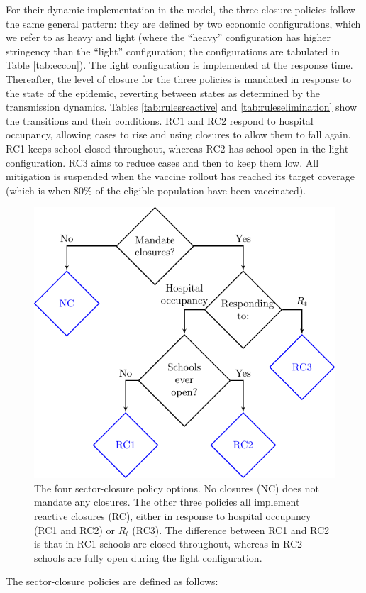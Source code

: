 \documentclass[
]{article}
\begin{document}
For their dynamic implementation in the model, the three closure policies follow the same general pattern: they are defined by two economic configurations, which we refer to as heavy and light (where the ``heavy'' configuration has higher stringency than the ``light'' configuration; the configurations are tabulated in Table \ref{tab:eccon}). The light configuration is implemented at the response time. Thereafter, the level of closure for the three policies is mandated in response to the state of the epidemic, reverting between states as determined by the transmission dynamics. Tables \ref{tab:rulesreactive} and \ref{tab:ruleselimination} show the transitions and their conditions. RC1 and RC2 respond to hospital occupancy, allowing cases to rise and using closures to allow them to fall again. RC1 keeps school closed throughout, whereas RC2 has school open in the light configuration. RC3 aims to reduce cases and then to keep them low. All mitigation is suspended when the vaccine rollout has reached its target coverage (which is when 80\% of the eligible population have been vaccinated).

\begin{figure}
\includegraphics[width=0.5\linewidth]{README_files/figure-latex/policies-1} \caption{The four sector-closure policy options. No closures (NC) does not mandate any closures. The other three policies all implement reactive closures (RC), either in response to hospital occupancy (RC1 and RC2) or $R_t$ (RC3). The difference between RC1 and RC2 is that in RC1 schools are closed throughout, whereas in RC2 schools are fully open during the light configuration.}\label{fig:policies}
\end{figure}

The sector-closure policies are defined as follows:
\end{document}
